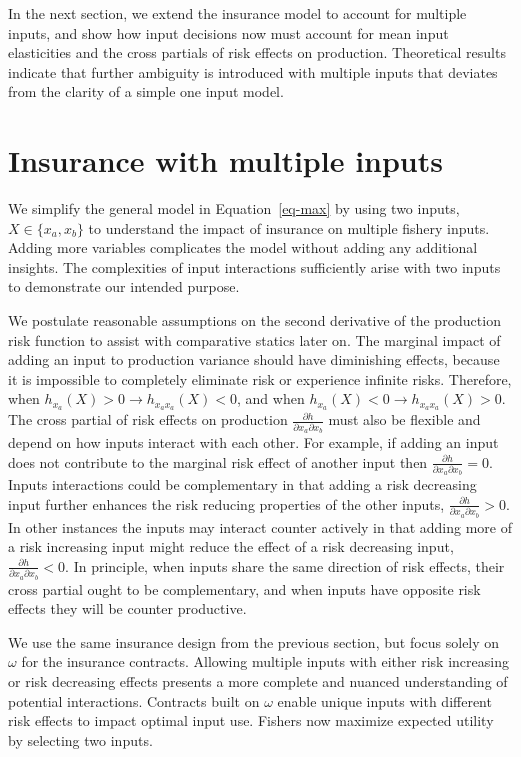 \documentclass[
  letterpaper,
  DIV=11,
  numbers=noendperiod]{scrartcl}
\theoremstyle{plain}
\theoremstyle{plain}
\theoremstyle{remark}
\begin{document}
In the next section, we extend the insurance model to account for
multiple inputs, and show how input decisions now must account for mean
input elasticities and the cross partials of risk effects on production.
Theoretical results indicate that further ambiguity is introduced with
multiple inputs that deviates from the clarity of a simple one input
model.

\hypertarget{sec-multi}{%
\section{Insurance with multiple inputs}\label{sec-multi}}

We simplify the general model in Equation~\ref{eq-max} by using two
inputs, \(X\in\{{x_a,x_b}\}\) to understand the impact of insurance on
multiple fishery inputs. Adding more variables complicates the model
without adding any additional insights. The complexities of input
interactions sufficiently arise with two inputs to demonstrate our
intended purpose.

We postulate reasonable assumptions on the second derivative of the
production risk function to assist with comparative statics later on.
The marginal impact of adding an input to production variance should
have diminishing effects, because it is impossible to completely
eliminate risk or experience infinite risks. Therefore, when
\(h_{x_a}(X)>0 \rightarrow h_{x_ax_a}(X)<0\), and when
\(h_{x_a}(X)<0 \rightarrow h_{x_ax_a}(X)>0\). The cross partial of risk
effects on production \(\frac{\partial h}{\partial x_a \partial x_b}\)
must also be flexible and depend on how inputs interact with each other.
For example, if adding an input does not contribute to the marginal risk
effect of another input then
\(\frac{\partial h}{\partial x_a \partial x_b}=0\). Inputs interactions
could be complementary in that adding a risk decreasing input further
enhances the risk reducing properties of the other inputs,
\(\frac{\partial h}{\partial x_a \partial x_b}>0\). In other instances
the inputs may interact counter actively in that adding more of a risk
increasing input might reduce the effect of a risk decreasing input,
\(\frac{\partial h}{\partial x_a \partial x_b}<0\). In principle, when
inputs share the same direction of risk effects, their cross partial
ought to be complementary, and when inputs have opposite risk effects
they will be counter productive.

We use the same insurance design from the previous section, but focus
solely on \(\omega\) for the insurance contracts. Allowing multiple
inputs with either risk increasing or risk decreasing effects presents a
more complete and nuanced understanding of potential interactions.
Contracts built on \(\omega\) enable unique inputs with different risk
effects to impact optimal input use. Fishers now maximize expected
utility by selecting two inputs.
\end{document}
